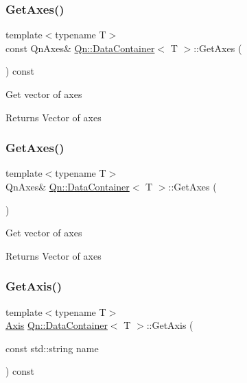 \subsubsection{\texorpdfstring{Get\+Axes()}{GetAxes()}\hspace{0.1cm}{\footnotesize\ttfamily [1/2]}}
{\footnotesize\ttfamily template$<$typename T$>$ \\
const Qn\+Axes\& \mbox{\hyperlink{classQn_1_1DataContainer}{Qn\+::\+Data\+Container}}$<$ T $>$\+::Get\+Axes (\begin{DoxyParamCaption}{ }\end{DoxyParamCaption}) const\hspace{0.3cm}{\ttfamily [inline]}}

Get vector of axes \begin{DoxyReturn}{Returns}
Vector of axes 
\end{DoxyReturn}
\mbox{\label{classQn_1_1DataContainer_acf5507cd4e2b1cb26b58b176b9a7cde3}} 
\subsubsection{\texorpdfstring{Get\+Axes()}{GetAxes()}\hspace{0.1cm}{\footnotesize\ttfamily [2/2]}}
{\footnotesize\ttfamily template$<$typename T$>$ \\
Qn\+Axes\& \mbox{\hyperlink{classQn_1_1DataContainer}{Qn\+::\+Data\+Container}}$<$ T $>$\+::Get\+Axes (\begin{DoxyParamCaption}{ }\end{DoxyParamCaption})\hspace{0.3cm}{\ttfamily [inline]}}

Get vector of axes \begin{DoxyReturn}{Returns}
Vector of axes 
\end{DoxyReturn}
\mbox{\label{classQn_1_1DataContainer_a1fdc10d4a7feb391aa7291900c9e2073}} 
\subsubsection{\texorpdfstring{Get\+Axis()}{GetAxis()}}
{\footnotesize\ttfamily template$<$typename T$>$ \\
\mbox{\hyperlink{classQn_1_1Axis}{Axis}} \mbox{\hyperlink{classQn_1_1DataContainer}{Qn\+::\+Data\+Container}}$<$ T $>$\+::Get\+Axis (\begin{DoxyParamCaption}\item[{const std\+::string}]{name }\end{DoxyParamCaption}) const\hspace{0.3cm}{\ttfamily [inline]}}

